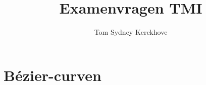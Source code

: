 \documentclass[12pt,a4paper]{article}
\author{Tom Sydney Kerckhove}
\title{Examenvragen TMI}
\begin{document}
\pagebreak



\part{B\'ezier-curven}
\iffalse
\section{Bespreek $C^{2}$ Continu\"iteit.}
\section{Hoe bekomt men $C^{2}$ continu\"iteit bij samengestelde b\'ezier curven?}
\section{Geef het algoritm van de Casteljau en bewijs de correctheid ervan.}
\section{Bespreek de variatieverminderingseigenschap.}
\section{Wat betekent de variatieverminderingseigenschap voor B\'ezier curven?}
\section{Wat betekent de variatieverminderingseigenschap voor splines?}
\section{Bespreek subdivisie en geef de methode.}
\section{Bespreek graadverhoding, geef het bewijs en leg uit waarvoor het dient.}
\section{Bespreek tensorproductoppervlakken aan de hand van B\'ezier-oppervlakken.}
\section{Bereken de tweede partiele afgeleide in de hoekpunten van een B\'ezier-oppervlak, leg uit en geef grafisch weer.}
\fi
\end{document}
